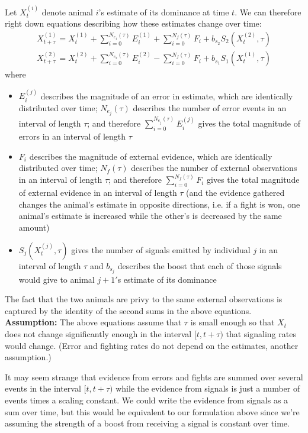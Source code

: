 \documentclass{article}
\begin{document}
Let $X_t^{(i)}$ denote animal $i$'s estimate of its dominance at time $t$.  We can therefore right down equations describing how these estimates change over time:
\begin{align*}
X_{t+\tau}^{(1)}=X_t^{(1)}+\sum_{i=0}^{N_{e_1}(\tau)}E_i^{(1)}+\sum_{i=0}^{N_f(\tau)}F_i+b_{s_2}S_2(X_t^{(2)},\tau)
\\ X_{t+\tau}^{(2)}=X_t^{(2)}+\sum_{i=0}^{N_{e_2}(\tau)}E_i^{(2)}-\sum_{i=0}^{N_f(\tau)}F_i+b_{s_1}S_1(X_t^{(1)},\tau)
\end{align*} 
where
\begin{itemize}
\item $E_i^{(j)}$ describes the magnitude of an error in estimate, which are identically distributed over time; $N_{e_j}(\tau)$ describes the number of error events in an interval of length $\tau$; and therefore $\sum_{i=0}^{N_{e_j}(\tau)}E_i^{(j)}$ gives the total magnitude of errors in an interval of length $\tau$

\item $F_i$ describes the magnitude of external evidence, which are identically distributed over time; $N_f(\tau)$ describes the number of external observations in an interval of length $\tau$; and therefore $\sum_{i=0}^{N_f(\tau)}F_i$ gives the total magnitude of external evidence in an interval of length $\tau$ (and the evidence gathered changes the animal's estimate in opposite directions, i.e. if a fight is won, one animal's estimate is increased while the other's is decreased by the same amount)

\item $S_j(X_t^{(j)},\tau)$ gives the number of signals emitted by individual $j$ in an interval of length $\tau$ and $b_{s_j}$ describes the boost that each of those signals would give to animal $j+1'$s estimate of its dominance

\end{itemize}
The fact that the two animals are privy to the same external observations is captured by the identity of the second sums in the above equations.  {\bf Assumption:} The above equations assume that $\tau$ is small enough so that $X_t$ does not change significantly enough in the interval $[t,t+\tau)$ that signaling rates would change.  (Error and fighting rates do not depend on the estimates, another assumption.)


It may seem strange that evidence from errors and fights are summed over several events in the interval $[t,t+\tau)$ while the evidence from signals is just a number of events times a scaling constant.  We could write the evidence from signals as a sum over time, but this would be equivalent to our formulation above since we're assuming the strength of a boost from receiving a signal is constant over time.  
\end{document}
